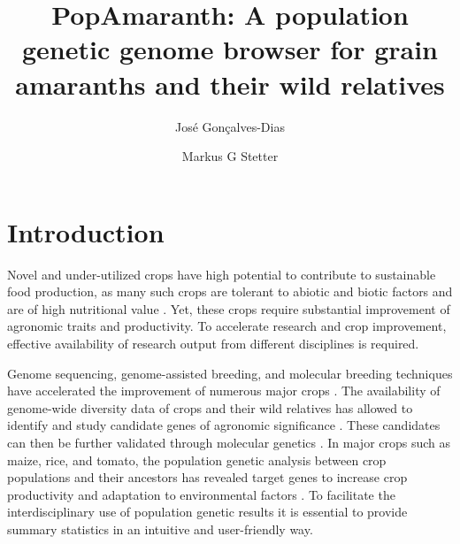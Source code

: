 \documentclass[9pt,twocolumn,twoside]{celabRxiv}
\title{PopAmaranth: A population genetic genome browser for grain amaranths and their wild relatives}
\author[$\ast$]{José Gonçalves-Dias}
\author[$\ast$,$\ddagger$,1]{Markus G Stetter}
\affil[$\ast$]{Dept. of Plant Sciences, University of Cologne, Cologne, Germany}
\affil[$\ddagger$]{Cluster of Excellence on Plant Sciences, University of Cologne, Cologne, Germany}
\newcommand{\jgd}[1]{{\small \textcolor{red}{#1}}}
\begin{document}
\maketitle
\thispagestyle{firststyle}
{}
\vspace{-11pt}%



\section{Introduction}

Novel and under-utilized crops have high potential to contribute to sustainable food production, as many such crops are tolerant to abiotic and biotic factors and are of high nutritional value \citep{mayes2012potential, tang2017phytochemicals, joshi2018zero, dawson2019role, abrouk2020fonio, aryamolecular}. 
Yet, these crops require substantial improvement of agronomic traits and productivity. 
To accelerate research and crop improvement, effective availability of research output from different disciplines is required. 

Genome sequencing, genome-assisted breeding, and molecular breeding techniques have accelerated the improvement of numerous major crops \citep{wallace2018road, lemmon2018rapid, fernie2019genome}.
The availability of genome-wide diversity data of crops and their wild relatives has allowed to identify and study candidate genes of agronomic significance \citep{hufford2012comparative,huang2012map,wang2020genome}.
These candidates can then be further validated through molecular genetics \citep{ross2007plant,fernie2019novo, sedeek2019plant, wang2020genome}. 
In major crops such as maize, rice, and tomato, the population genetic analysis between crop populations and their ancestors has revealed target genes to increase crop productivity and adaptation to environmental factors \citep{hufford2012comparative,huang2012map,tomato2012tomato, wang2020genome}.
To facilitate the interdisciplinary use of population genetic results it is essential to provide summary statistics in an intuitive and user-friendly way. 


\end{document}
